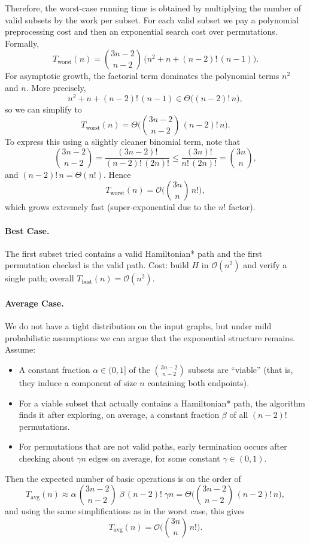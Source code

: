 \documentclass[11pt]{article}
\begin{document}
Therefore, the worst-case running time is obtained by multiplying the number of valid subsets by the work per subset. For each valid subset we pay a polynomial preprocessing cost and then an exponential search cost over permutations. Formally,
\[
T_{\text{worst}}(n)
 = \binom{3n-2}{\,n-2\,}\,\big(n^2 + n + (n-2)!\,(n-1)\big).
\]
For asymptotic growth, the factorial term dominates the polynomial terms $n^2$ and $n$. More precisely,
\[
n^2 + n + (n-2)!\,(n-1) \in \Theta\big((n-2)!\,n\big),
\]
so we can simplify to
\[
T_{\text{worst}}(n)
 = \Theta\!\big(\binom{3n-2}{\,n-2\,}\,(n-2)!\,n\big).
\]
To express this using a slightly cleaner binomial term, note that
\[
\binom{3n-2}{n-2} = \frac{(3n-2)!}{(n-2)!\,(2n)!}
\le \frac{(3n)!}{n!\,(2n)!} = \binom{3n}{n},
\]
and $(n-2)!\,n = \Theta(n!)$. Hence
\[
T_{\text{worst}}(n) = \mathcal{O}\!\big(\binom{3n}{n}\, n!\big),
\]
which grows extremely fast (super-exponential due to the $n!$ factor).

\paragraph{Best Case.} The first subset tried contains a valid Hamiltonian* path and the first permutation checked is the valid path. Cost: build $H$ in $\mathcal{O}(n^2)$ and verify a single path; overall $T_{\text{best}}(n)=\mathcal{O}(n^2)$.

\paragraph{Average Case.} We do not have a tight distribution on the input graphs, but under mild probabilistic assumptions we can argue that the exponential structure remains. Assume:
\begin{itemize}
	\item A constant fraction $\alpha \in (0,1]$ of the $\binom{3n-2}{n-2}$ subsets are ``viable'' (that is, they induce a component of size $n$ containing both endpoints).
	\item For a viable subset that actually contains a Hamiltonian* path, the algorithm finds it after exploring, on average, a constant fraction $\beta$ of all $ (n-2)!$ permutations.
	\item For permutations that are not valid paths, early termination occurs after checking about $\gamma n$ edges on average, for some constant $\gamma \in (0,1)$.
\end{itemize}
Then the expected number of basic operations is on the order of
\[
T_{\text{avg}}(n)
 \approx \alpha\,\binom{3n-2}{n-2}\; \beta\,(n-2)!\; \gamma n
 = \Theta\!\big(\binom{3n-2}{n-2}\,(n-2)!\,n\big),
\]
and using the same simplifications as in the worst case, this gives
\[
T_{\text{avg}}(n) = \mathcal{O}\!\big(\binom{3n}{n}\, n!\big).
\]
\end{document}
